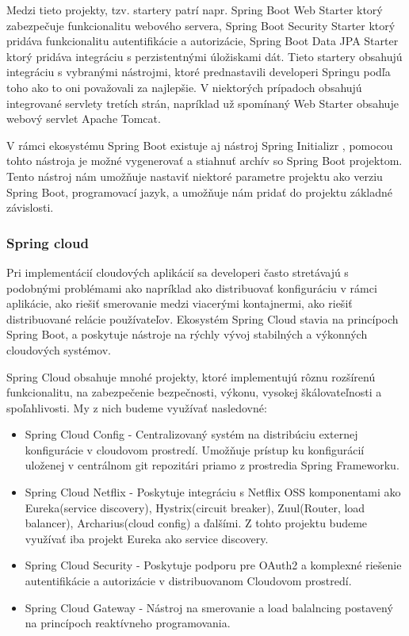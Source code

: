 Medzi tieto projekty, tzv. startery patrí napr. Spring Boot Web Starter ktorý zabezpečuje funkcionalitu webového servera, Spring Boot Security Starter ktorý pridáva funkcionalitu autentifikácie a autorizácie, Spring Boot Data JPA Starter ktorý pridáva integráciu s perzistentnými úložiskami dát. Tieto startery obsahujú integráciu s vybranými nástrojmi, ktoré prednastavili developeri Springu podľa toho ako to oni považovali za najlepšie. V niektorých prípadoch obsahujú integrované servlety tretích strán, napríklad už spomínaný Web Starter obsahuje webový servlet Apache Tomcat. 

V rámci ekosystému Spring Boot existuje aj nástroj Spring Initializr \cite{initializr}, pomocou tohto nástroja je možné vygenerovať a stiahnuť archív so Spring Boot projektom. Tento nástroj nám umožňuje nastaviť niektoré parametre projektu ako verziu Spring Boot, programovací jazyk, a umožňuje nám pridať do projektu základné závislosti.   

\subsubsection{Spring cloud}
Pri implementácií cloudových aplikácií sa developeri často stretávajú s podobnými problémami ako napríklad ako distribuovať konfiguráciu v rámci aplikácie, ako riešiť smerovanie medzi viacerými kontajnermi, ako riešiť distribuované relácie používateľov. Ekosystém Spring Cloud stavia na princípoch Spring Boot, a poskytuje nástroje na rýchly vývoj stabilných a výkonných cloudových systémov. 

Spring Cloud obsahuje mnohé projekty, ktoré implementujú rôznu rozšírenú funkcionalitu, na zabezpečenie bezpečnosti, výkonu, vysokej škálovateľnosti a spoľahlivosti.
My z nich budeme využívať nasledovné:

\begin{itemize}
\item Spring Cloud Config - Centralizovaný systém na distribúciu externej konfigurácie v cloudovom prostredí. Umožňuje prístup ku konfigurácií uloženej v centrálnom git repozitári priamo z prostredia Spring Frameworku.
\item Spring Cloud Netflix - Poskytuje integráciu s Netflix OSS komponentami ako Eureka(service discovery), Hystrix(circuit breaker), Zuul(Router, load balancer), Archarius(cloud config) a ďalšími. Z tohto projektu budeme využívať iba projekt Eureka ako service discovery.
\item Spring Cloud Security - Poskytuje podporu pre OAuth2 a komplexné riešenie autentifikácie a autorizácie v distribuovanom Cloudovom prostredí.
\item Spring Cloud Gateway - Nástroj na smerovanie a load balalncing postavený na princípoch reaktívneho programovania.
\end{itemize}




